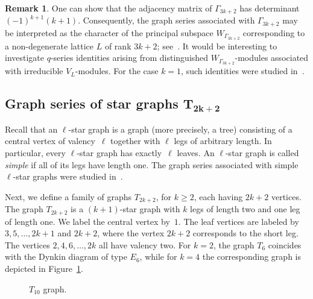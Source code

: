 \documentclass[pdftex]{sigma}
\numberwithin{equation}{section}
\theoremstyle{definition}
\newtheorem{Remark}[Theorem]{Remark}
\begin{document}
\begin{Remark}One can show that the adjacency matrix of $\Gamma_{3k+2}$ has determinant $(-1)^{k+1}{(k+1)}$.
Consequently, the graph series associated with $\Gamma_{3k+2}$ may be interpreted as the character of the principal subspace $W_{\Gamma_{3k+2}}$ corresponding to a non-degenerate lattice $L$ of rank $3k+2$; see~\cite{MP}.
It would be interesting to investigate $q$-series identities arising from distinguished $W_{\Gamma_{3k+2}}$-modules associated with irreducible $V_L$-modules.
For the case $k=1$, such identities were studied in~\cite{BJM}.
\end{Remark}

\subsection[Graph series of star graphs T\_\{2k+2\}]{Graph series of star graphs $\boldsymbol{T_{2k+2}}$}\label{section2.3}

Recall that an $\ell$-star graph is a graph (more precisely, a tree) consisting of a central vertex of valency~$\ell$ together with $\ell$ legs of arbitrary length.
In particular, every $\ell$-star graph has exactly~$\ell$ leaves.
An $\ell$-star graph is called \emph{simple} if all of its legs have length one.
The graph series associated with simple $\ell$-star graphs were studied in~\cite{BJM}.

Next, we define a family of graphs $T_{2k+2}$, for $k \geq 2$, each having $2k+2$ vertices.
The graph $T_{2k+2}$ is a $(k+1)$-star graph with $k$ legs of length two and one leg of length one.
We label the central vertex by~$1$.
The leaf vertices are labeled by $3,5,\dots,2k+1$ and $2k+2$, where the vertex $2k+2$ corresponds to the short leg.
The vertices $2,4,6,\dots,2k$ all have valency two.
For $k=2$, the graph $T_6$ coincides with the Dynkin diagram of type $E_6$, while for $k=4$ the corresponding graph is depicted in Figure~\ref{T10}.
\begin{figure}[!ht]\centering
{}\vspace{-1mm}

\caption{$T_{10}$ graph.} \label{T10}
\end{figure}
\end{document}

